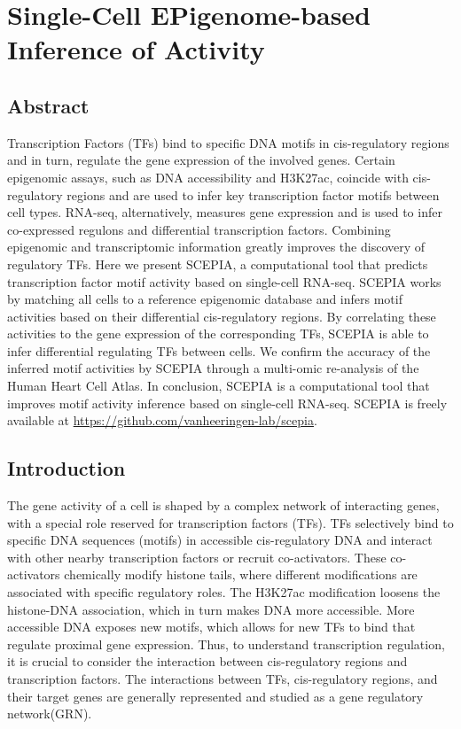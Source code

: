 \chapter{Single-Cell EPigenome-based Inference of Activity}\thumbforchapter
{}
\newpage

\section{Abstract}

Transcription Factors (TFs) bind to specific DNA motifs in cis-regulatory regions and in turn, regulate the gene expression of the involved genes. Certain epigenomic assays, such as DNA accessibility and H3K27ac, coincide with cis-regulatory regions and are used to infer key transcription factor motifs between cell types. RNA-seq, alternatively, measures gene expression and is used to infer co-expressed regulons and differential transcription factors. Combining epigenomic and transcriptomic information greatly improves the discovery of regulatory TFs. Here we present SCEPIA, a computational tool that predicts transcription factor motif activity based on single-cell RNA-seq. SCEPIA works by matching all cells to a reference epigenomic database and infers motif activities based on their differential cis-regulatory regions. By correlating these activities to the gene expression of the corresponding TFs, SCEPIA is able to infer differential regulating TFs between cells. We confirm the accuracy of the inferred motif activities by SCEPIA through a multi-omic re-analysis of the Human Heart Cell Atlas. In conclusion, SCEPIA is a computational tool that improves motif activity inference based on single-cell RNA-seq. SCEPIA is freely available at \url{https://github.com/vanheeringen-lab/scepia}.

\section{Introduction}

The gene activity of a cell is shaped by a complex network of interacting genes, with a special role reserved for transcription factors (TFs). TFs selectively bind to specific DNA sequences (motifs) in accessible cis-regulatory DNA and interact with other nearby transcription factors or recruit co-activators\cite{Spitz2012}. These co-activators chemically modify histone tails, where different modifications are associated with specific regulatory roles. The H3K27ac modification loosens the histone-DNA association, which in turn makes DNA more accessible\cite{Creyghton2010}. More accessible DNA exposes new motifs, which allows for new TFs to bind that regulate proximal gene expression\cite{Tsompana2014}. Thus, to understand transcription regulation, it is crucial to consider the interaction between cis-regulatory regions and transcription factors\cite{Xu_2020,Kamal_2021,Gonz_lez_Blas_2022,Fleck2022,Kamimoto2023,Kartha2022}. The interactions between TFs, cis-regulatory regions, and their target genes are generally represented and studied as a gene regulatory network(GRN).

